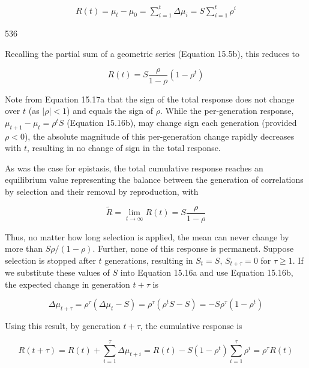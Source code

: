 \documentclass{article}
\begin{document}
\begin{equation}
\begin{align*}R(t)=\mu_t-\mu_0=\sum\limits_{i=1}^t\Delta\mu_i=S\sum\limits_{i=1}^t\rho^i\end{align*}
\tag{15.16c}
\label{eq:15_16c}
\end{equation}

536

Recalling the partial sum of a geometric series (Equation 15.5b), this reduces to

\begin{equation}
R(t)=S\frac{\rho}{1-\rho}\left(1-\rho^{t}\right)
\tag{15.17a}
\label{eq:15_17a}
\end{equation}

Note from Equation 15.17a that the sign of the total response does not change over  $ t $ (as  $ |\rho| < 1 $) and equals the sign of  $ \rho $. While the per-generation response,  $ \mu_{t+1} - \mu_t = \rho^t S $ (Equation 15.16b), may change sign each generation (provided  $ \rho < 0 $), the absolute magnitude of this per-generation change rapidly decreases with  $ t $, resulting in no change of sign in the total response.

As was the case for epistasis, the total cumulative response reaches an equilibrium value representing the balance between the generation of correlations by selection and their removal by reproduction, with

\begin{equation}
\widetilde{R}=\lim_{t\to\infty}R(t)=S\frac{\rho}{1-\rho}
\tag{15.17b}
\label{eq:15_17b}
\end{equation}

Thus, no matter how long selection is applied, the mean can never change by more than  $ S\rho/(1-\rho) $. Further, none of this response is permanent. Suppose selection is stopped after  $ t $ generations, resulting in  $ S_t = S $,  $ S_{t+\tau} = 0 $ for  $ \tau \geq 1 $. If we substitute these values of  $ S $ into Equation 15.16a and use Equation 15.16b, the expected change in generation  $ t + \tau $ is

\begin{equation}
\Delta\mu_{t+\tau}=\rho^{\tau}\left(\Delta\mu_{t}-S\right)=\rho^{\tau}\left(\rho^{t}S-S\right)=-S\rho^{\tau}(1-\rho^{t})
\tag{15.18}
\label{eq:15_18}
\end{equation}

Using this result, by generation  $ t + \tau $, the cumulative response is

\begin{equation}
R(t+\tau)=R(t)+\sum_{i=1}^{\tau}\Delta\mu_{t+i}=R(t)-S\left(1-\rho^{t}\right)\sum_{i=1}^{\tau}\rho^{i}=\rho^{\tau}R(t)
\tag{15.19a}
\label{eq:15_19a}
\end{equation}
\end{document}
